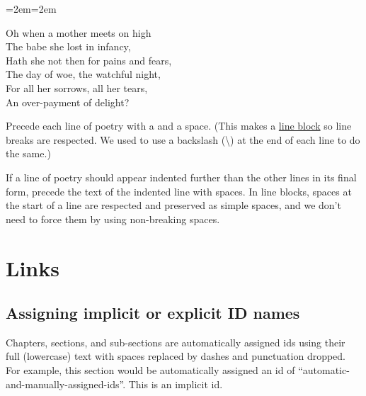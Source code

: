 \documentclass[
  english,
]{book}
\newenvironment{poetry}[0]{\par\leftskip=2em\rightskip=2em}{\par\medskip}
\begin{document}
\begin{poetry}

Oh when a mother meets on high\\
The babe she lost in infancy,\\
Hath she not then for pains and fears,\\
\hspace*{0.333em}\hspace*{0.333em}\hspace*{0.333em}\hspace*{0.333em}The day of woe, the watchful night,\\
For all her sorrows, all her tears,\\
\hspace*{0.333em}\hspace*{0.333em}\hspace*{0.333em}\hspace*{0.333em}An over-payment of delight?

\end{poetry}

Precede each line of poetry with a \textbar{} and a space. (This makes a \href{https://pandoc.org/MANUAL.html\#line-blocks}{line block} so line breaks are respected. We used to use a backslash (\textbackslash) at the end of each line to do the same.)

If a line of poetry should appear indented further than the other lines in its final form, precede the text of the indented line with spaces. In line blocks, spaces at the start of a line are respected and preserved as simple spaces, and we don't need to force them by using non-breaking spaces.

\hypertarget{links}{%
\chapter{Links}\label{links}}

\hypertarget{assigning-ids}{%
\section{Assigning implicit or explicit ID names}\label{assigning-ids}}

Chapters, sections, and sub-sections are automatically assigned ids using their full (lowercase) text with spaces replaced by dashes and punctuation dropped. For example, this section would be automatically assigned an id of ``automatic-and-manually-assigned-ids''. This is an implicit id.
\end{document}
